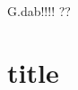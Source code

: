 \documentclass{ctexart}
\begin{document}
\thispagestyle{coverpage}
\Huge{G.dab!!!!}
??
\chapter[short]{title}
\end{document}
